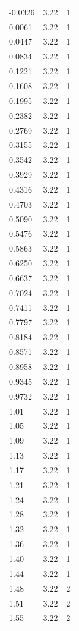 \begin{longtable}{lrr}
  -0.0326 & 3.22 & 1 \\
  0.0061 & 3.22 & 1 \\
  0.0447 & 3.22 & 1 \\
  0.0834 & 3.22 & 1 \\
  0.1221 & 3.22 & 1 \\
  0.1608 & 3.22 & 1 \\
  0.1995 & 3.22 & 1 \\
  0.2382 & 3.22 & 1 \\
  0.2769 & 3.22 & 1 \\
  0.3155 & 3.22 & 1 \\
  0.3542 & 3.22 & 1 \\
  0.3929 & 3.22 & 1 \\
  0.4316 & 3.22 & 1 \\
  0.4703 & 3.22 & 1 \\
  0.5090 & 3.22 & 1 \\
  0.5476 & 3.22 & 1 \\
  0.5863 & 3.22 & 1 \\
  0.6250 & 3.22 & 1 \\
  0.6637 & 3.22 & 1 \\
  0.7024 & 3.22 & 1 \\
  0.7411 & 3.22 & 1 \\
  0.7797 & 3.22 & 1 \\
  0.8184 & 3.22 & 1 \\
  0.8571 & 3.22 & 1 \\
  0.8958 & 3.22 & 1 \\
  0.9345 & 3.22 & 1 \\
  0.9732 & 3.22 & 1 \\
  1.01 & 3.22 & 1 \\
  1.05 & 3.22 & 1 \\
  1.09 & 3.22 & 1 \\
  1.13 & 3.22 & 1 \\
  1.17 & 3.22 & 1 \\
  1.21 & 3.22 & 1 \\
  1.24 & 3.22 & 1 \\
  1.28 & 3.22 & 1 \\
  1.32 & 3.22 & 1 \\
  1.36 & 3.22 & 1 \\
  1.40 & 3.22 & 1 \\
  1.44 & 3.22 & 1 \\
  1.48 & 3.22 & 2 \\
  1.51 & 3.22 & 2 \\
  1.55 & 3.22 & 2 \\

\end{longtable}
